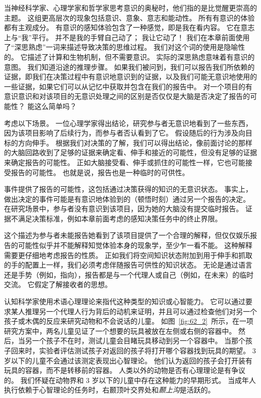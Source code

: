 当神经科学家、心理学家和哲学家思考意识的奥秘时，他们指的是比觉醒更崇高的主题。
这组更高层次的现象包括意识、意象、意志和能动性。
所有有意识的体验都有主观成分。
有意识的感知体验包含了一种感觉，即是我在看内容。
它在意志上与“我”平行。
并不是我的手臂自己动了；
我让它动了！
我们在本章前面使用了“深思熟虑”一词来描述导致决策的思维过程。
我们对这个词的使用是隐喻性的。
它描述了计算和生物机制，但不需要意识。
实际的深思熟虑意味着有意识的意图。
我们知道沿途的推理步骤。
如果我们被问到，我们可以报告我们所依赖的证据，即我们在决策过程中有意识地意识到的证据，以及我们可能无意识地使用的一些证据，如果它们可以从记忆中获取并包含在我们的报告中。
对一个项目的有意识意识和对该项目的无意识处理之间的区别是否仅仅是大脑是否决定了报告的可能性？
能这么简单吗？


考虑以下场景。
一位心理学家得出结论，研究参与者无意识地看到了一些东西，因为该项目影响了后续行为，而参与者否认看到了它。
假设随后的行为涉及向目标的方向伸手。
根据我们对决策的了解，我们可以得出结论，像前面讨论的那样的大脑回路收到了足够的证据来确定看、伸手和接近的可能性，但没有足够的证据来确定报告的可能性。
正如大脑接受看、伸手或抓住的可能性一样，它也可能接受报告的可能性。
也就是说，报告也是一种临时的可供性。


事件提供了报告的可能性，这包括通过决策获得的知识的无意识状态。
事实上，做出决定的事件可能是有意识地体验到的（顿悟时刻）通过另一个报告的决定。
在研究场景中，参与者没有意识到该项目，因为她的大脑没有提交临时报告。
证据不满足决策标准，例如本章前面考虑的感知决策任务中的终止界限。


这个描述为参与者未能报告她看到了该项目提供了一个合理的解释，但仅仅娱乐报告的可能性似乎并不能解释知觉体验本身的现象学，至少乍一看不能。
这种解释需要更仔细地考虑报告的性质。
正如我们将空间知识状态附加到用于伸手和抓取的手的配置上一样，我们必须考虑伴随报告可供性的知识状态。
无论是通过语言还是手势（例如，指向），报告都是与一个代理人或自己（例如，在未来）的临时交流。
它假定了解接收者的思想。


认知科学家使用术语心理理论来指代这种类型的知识或心智能力。
它可以通过要求某人推理另一个代理人行为背后的动机来证明，并且可以通过检查他们对另一个孩子或木偶的反应来研究动物和不会说话的儿童。
如图~\ref{fig:62_2}~所示，在一项研究方案中，两名儿童见证了一个想要的玩具被放在左侧或右侧的容器中。
然后，当另一个孩子不在时，测试儿童会目睹玩具移动到另一个容器中。
当那个孩子回来时，实验者评估测试孩子对返回的孩子将打开哪个容器找到玩具的期望。
3 岁以下的儿童不会通过该测定表现出心智理论。
他们认为返回的孩子会打开装有玩具的容器，而不是转移前的容器。
人类以外的动物是否有心理理论是有争议的。
我们怀疑在动物界和 3 岁以下的儿童中存在这种能力的早期形式。
当成年人执行依赖于心智理论的任务时，右颞顶叶交界处和\textit{颞上沟}是活跃的。


